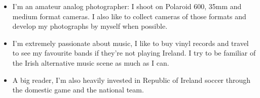 \documentclass[letterpaper,11pt]{article}
\newcommand{\resumeItem}[1]{
  \item\small{
    {#1 \vspace{-2pt}}
  }
}
\newcommand{\resumeItemListStart}{\begin{itemize}}
\newcommand{\resumeItemListEnd}{\end{itemize}\vspace{-5pt}}
\begin{document}
\resumeItemListStart
\resumeItem{I'm an amateur analog photographer: I shoot on Polaroid 600, 35mm and medium format cameras. I also like to collect cameras of those formats and develop my photographs by myself when possible.}
\vspace{-2pt}
\resumeItem{I'm extremely passionate about music, I like to buy vinyl records and travel to see my favourite bands if they're not playing Ireland. I try to be familiar of the Irish alternative music scene as much as I can. }
\vspace{-2pt}
\resumeItem{A big reader, I'm also heavily invested in Republic of Ireland soccer through the domestic game and the national team. }
\vspace{-2pt}
\resumeItemListEnd
\end{document}
